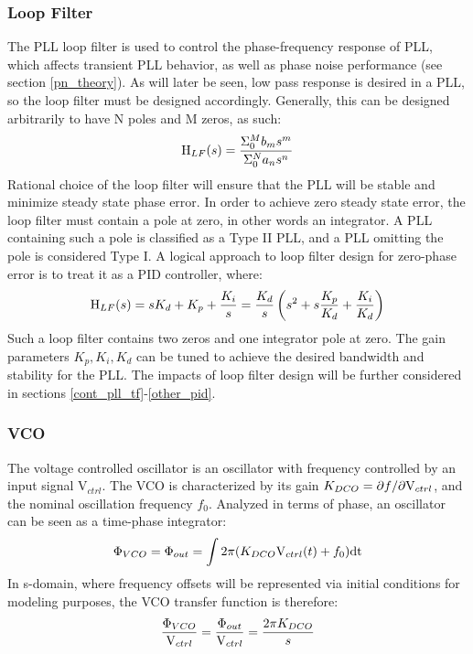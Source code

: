 		\subsubsection{Loop Filter}
			The PLL loop filter is used to control the phase-frequency response of PLL, which affects transient PLL behavior, as well as phase noise performance (see section \ref{pn_theory}). As will later be seen, low pass response is desired in a PLL, so the loop filter must be designed accordingly. Generally, this can be designed arbitrarily to have N poles and M zeros, as such:
			\begin{equation}
				\textnormal{H}_{LF}(s) = \frac{\Sigma_0^M b_ms^m}{\Sigma_0^N a_ns^n}
			\end{equation}
			Rational choice of the loop filter will ensure that the PLL will be stable and minimize steady state phase error. In order to achieve zero steady state error, the loop filter must contain a pole at zero, in other words an integrator. A PLL containing such a pole is classified as a Type II PLL, and a PLL omitting the pole is considered Type I. A logical approach to loop filter design for zero-phase error is to treat it as a PID controller, where:
			\begin{equation}
				\textnormal{H}_{LF}(s) = sK_d + K_p + \frac{K_i}{s} = \frac{K_d}{s}\left(s^2 + s\frac{K_p}{K_d} + \frac{K_i}{K_d}\right)
			\end{equation}
			Such a loop filter contains two zeros and one integrator pole at zero. The gain parameters $K_p, K_i, K_d$ can be tuned to achieve the desired bandwidth and stability for the PLL. The impacts of loop filter design will be further considered in sections \ref{cont_pll_tf}-\ref{other_pid}.
			
		\subsubsection{VCO}
			The voltage controlled oscillator is an oscillator with frequency controlled by an input signal V$_{ctrl}$. The VCO is characterized by its gain $K_{DCO} = \partial f/\partial \textnormal{V}_{ctrl}$, and the nominal oscillation frequency $f_0$. Analyzed in terms of phase, an oscillator can be seen as a time-phase integrator:
			\begin{equation}
				\Phi_{VCO} = \Phi_{out} = \int2\pi(K_{DCO}\textnormal{V}_{ctrl}(t) + f_0)\mathrm{dt}
			\end{equation}
			In s-domain, where frequency offsets will be represented via initial conditions for modeling purposes, the VCO transfer function is therefore:
			\begin{equation}
				\frac{\Phi_{VCO}}{\textnormal{V}_{ctrl}} = \frac{\Phi_{out}}{\textnormal{V}_{ctrl}} = \frac{2\pi K_{DCO}}{s}
			\end{equation}

